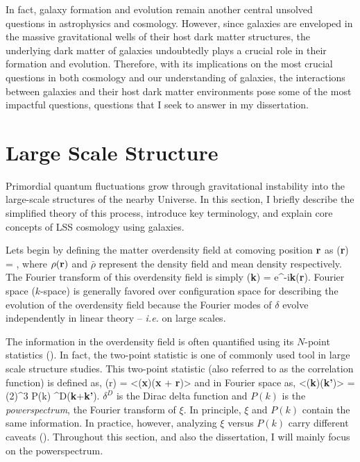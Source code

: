 In fact, galaxy formation and evolution remain another central unsolved questions in
astrophysics and cosmology. However, since galaxies are enveloped in the massive gravitational
wells of their host dark matter structures, the underlying dark matter of galaxies undoubtedly
plays a crucial role in their formation and evolution. Therefore, with its implications on the most
crucial questions in both cosmology and our understanding of galaxies, the interactions between
galaxies and their host dark matter environments pose some of the most impactful questions,
questions that I seek to answer in my dissertation. 


\section{Large Scale Structure}
Primordial quantum fluctuations grow through gravitational instability into 
the large-scale structures of the nearby Universe. In this section, I briefly 
describe the simplified theory of this process, introduce key terminology, and 
explain core concepts of LSS cosmology using galaxies.

Lets begin by defining the matter overdensity field at comoving position 
${\bf r}$ as
\beq
\delta({\bf r}) = , 
\eeq
where $\rho({\bf r})$ and $\bar{\rho}$ represent the density field and mean 
density respectively. The Fourier transform of this overdensity field is 
simply 
\beq
\delta({\bf k}) = \int {} e^{-i{\bf k}}\;\delta({\bf r}).
\eeq
Fourier space ($k$-space) is generally favored over configuration space for 
describing the evolution of the overdensity field because the Fourier modes 
of $\delta$ evolve independently in linear theory -- \emph{i.e.} on large scales.

The information in the overdensity field is often quantified using its 
$N$-point statistics (). In fact, the two-point
statistic is one of commonly used tool in large scale structure studies.
This two-point statistic (also referred to as the correlation function) is
defined as, 
\beq
\xi(r) = <\delta({\bf x})\delta({\bf x} +  {\bf r})>
\eeq
and in Fourier space as,
\beq
<\delta({\bf k})\delta({\bf k'})> = (2\pi)^3 P(k) \delta^{D}({\bf k}+{\bf k'}).
\eeq
$\delta^{D}$ is the Dirac delta function and $P(k)$ is the {\em powerspectrum}, 
the Fourier transform of $\xi$. In principle, $\xi$ and $P(k)$ contain the same 
information. In practice, however, analyzing $\xi$ versus $P(k)$ carry different 
caveats (). Throughout this section, and also the dissertation, 
I will mainly focus on the powerspectrum. 

